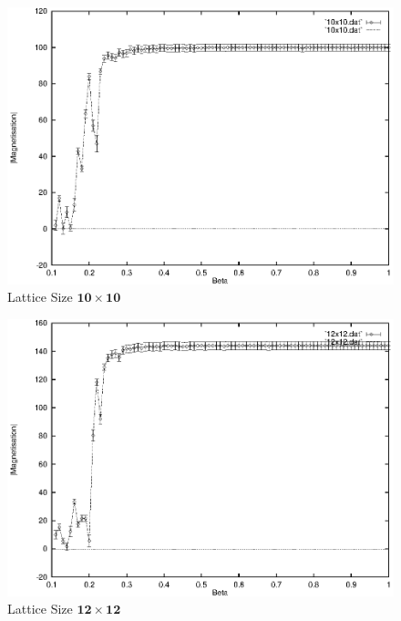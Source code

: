 \documentclass[a4paper]{IEEEtran}
\begin{document}
    \begin{figure} 
    \caption{Lattice Size $\mathbf{10 \times 10}$}
    \label{fig:10x10-2} 
    \begin{center}
        \includegraphics[width=\columnwidth]{10x10_2.eps}
    \end{center}
    \end{figure} 

    \begin{figure}
    \caption{Lattice Size $\mathbf{12 \times 12}$}
    \label{fig:12x12-2} 
    \begin{center}
        \includegraphics[width=\columnwidth]{12x12_2.eps}
    \end{center}
    \end{figure} 
\end{document}
